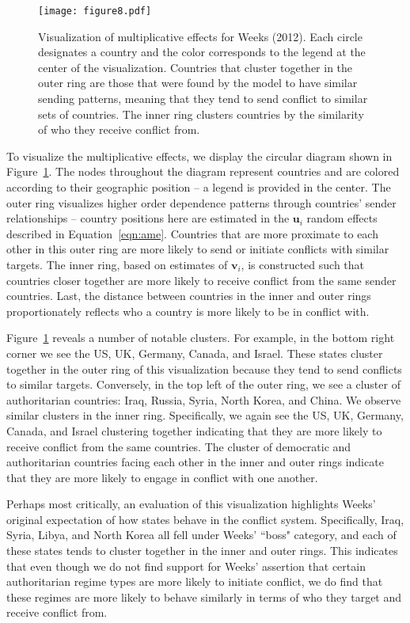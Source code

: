 \documentclass[12pt]{amsart}
\begin{document}
\begin{figure}[!h]
	\texttt{[image: figure8.pdf]}
	\caption{ Visualization of multiplicative effects for Weeks (2012). Each circle designates a country and the color corresponds to the legend at the center of the visualization. Countries that cluster together in the outer ring are those that were found by the model to have similar sending patterns, meaning that they tend to send conflict to similar sets of countries. The inner ring clusters countries by the similarity of who they receive conflict from.
	}
	\label{fig:weekscirc}
\end{figure}
\FloatBarrier

To visualize the multiplicative effects, we display the circular diagram shown in Figure~\ref{fig:weekscirc}. The nodes throughout the diagram represent countries and are colored according to their geographic position -- a legend is provided in the center. The outer ring visualizes higher order dependence patterns through countries' sender relationships -- country positions here are estimated in the $\mathbf{u}_{i}$ random effects described in Equation~\ref{eqn:ame}. Countries that are more proximate to each other in this outer ring are more likely to send or initiate conflicts with similar targets. The inner ring, based on estimates of $\mathbf{v}_{i}$, is constructed such that countries closer together are more likely to receive conflict from the same sender countries. Last, the distance between countries in the inner and outer rings proportionately reflects who a country is more likely to be in conflict with.

Figure~\ref{fig:weekscirc} reveals a number of notable clusters. For example, in the bottom right corner we see the US, UK, Germany, Canada, and Israel. These states cluster together in the outer ring of this visualization because they tend to send conflicts to similar targets. Conversely, in the top left of the outer ring, we see a cluster of authoritarian countries: Iraq, Russia, Syria, North Korea, and China. We observe similar clusters in the inner ring. Specifically, we again see the US, UK, Germany, Canada, and Israel clustering together indicating that they are more likely to receive conflict from the same countries.  The  cluster of democratic and authoritarian countries facing each other in the inner and outer rings indicate that they are more likely to engage in conflict with one another.

Perhaps most critically, an evaluation of this visualization highlights Weeks' original expectation of how states behave in the conflict system.  Specifically, Iraq, Syria, Libya, and North Korea all fell under Weeks' ``boss" category, and each of these states tends to cluster together in the inner and outer rings. This indicates that even though we do not find support for Weeks' assertion that certain authoritarian regime types are more likely to initiate conflict, we do find that these regimes are more likely to behave similarly in terms of who they target and receive conflict from.
\end{document}
